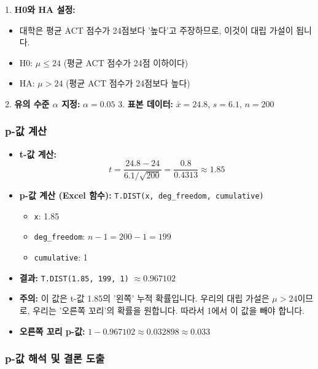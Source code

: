 \documentclass[11pt,a4paper]{article}
\theoremstyle{definition}
\begin{document}
1.  \textbf{H0와 HA 설정:}
    \begin{itemize}
        \item 대학은 평균 ACT 점수가 24점보다 '높다'고 주장하므로, 이것이 대립 가설이 됩니다.
        \item H0: $\mu \le 24$ (평균 ACT 점수가 24점 이하이다)
        \item HA: $\mu > 24$ (평균 ACT 점수가 24점보다 높다)
    \end{itemize}
2.  \textbf{유의 수준 $\alpha$ 지정:} $\alpha = 0.05$
3.  \textbf{표본 데이터:} $\bar{x} = 24.8$, $s = 6.1$, $n = 200$

\subsubsection*{p-값 계산}

\begin{itemize}
    \item \textbf{t-값 계산:}
    \[ t = \frac{24.8 - 24}{6.1 / \sqrt{200}} = \frac{0.8}{0.4313} \approx 1.85 \]
    \item \textbf{p-값 계산 (Excel 함수):} \texttt{T.DIST(x, deg_freedom, cumulative)}
        \begin{itemize}
            \item \texttt{x}: 1.85
            \item \texttt{deg_freedom}: $n-1 = 200-1 = 199$
            \item \texttt{cumulative}: 1
        \end{itemize}
    \item \textbf{결과:} \texttt{T.DIST(1.85, 199, 1)} $\approx 0.967102$
    \item \textbf{주의:} 이 값은 t-값 1.85의 '왼쪽' 누적 확률입니다. 우리의 대립 가설은 $\mu > 24$이므로, 우리는 '오른쪽 꼬리'의 확률을 원합니다. 따라서 1에서 이 값을 빼야 합니다.
    \item \textbf{오른쪽 꼬리 p-값:} $1 - 0.967102 \approx 0.032898 \approx 0.033$
\end{itemize}

\subsubsection*{p-값 해석 및 결론 도출}
\end{document}
